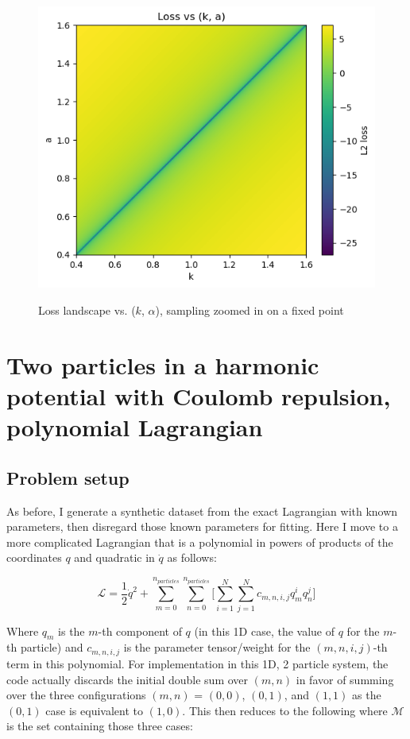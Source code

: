 \documentclass[]{article}
\begin{document}
\begin{figure}[H]
	\caption{Loss landscape vs. ($k$, $\alpha$), sampling zoomed in on a fixed point}
	\centering
	\includegraphics[scale=0.70]{loss-landscape-fixed-point-close.png}
	\label{fig:loss-landscape-fixed-point-close}
\end{figure}

\section{Two particles in a harmonic potential with Coulomb repulsion, polynomial Lagrangian}
\subsection{Problem setup}
As before, I generate a synthetic dataset from the exact Lagrangian with known parameters, then disregard those known parameters for fitting. Here I move to a more complicated Lagrangian that is a polynomial in powers of products of the coordinates $q$ and quadratic in $\dot{q}$ as follows:


\begin{equation}
	\mathcal{L} = \frac{1}{2} \dot{q}^2 + \sum_{m=0}^{n_{particles}} \sum_{n=0}^{n_{particles}} \Bigg[\sum_{i=1}^{N} \sum_{j=1}^{N} c_{m,n,i,j} q_m^i q_n^j\Bigg]
\end{equation}

Where $q_m$ is the $m$-th component of $q$ (in this 1D case, the value of $q$ for the $m$-th particle) and $c_{m,n,i,j}$ is the parameter tensor/weight for the $(m,n,i,j)$-th term in this polynomial. For implementation in this 1D, 2 particle system, the code actually discards the initial double sum over $(m,n)$ in favor of summing over the three configurations $(m,n)$ = $(0,0)$, $(0,1)$, and $(1,1)$ as the $(0,1)$ case is equivalent to $(1,0)$. This then reduces to the following where $\mathcal{M}$ is the set containing those three cases:
\end{document}
